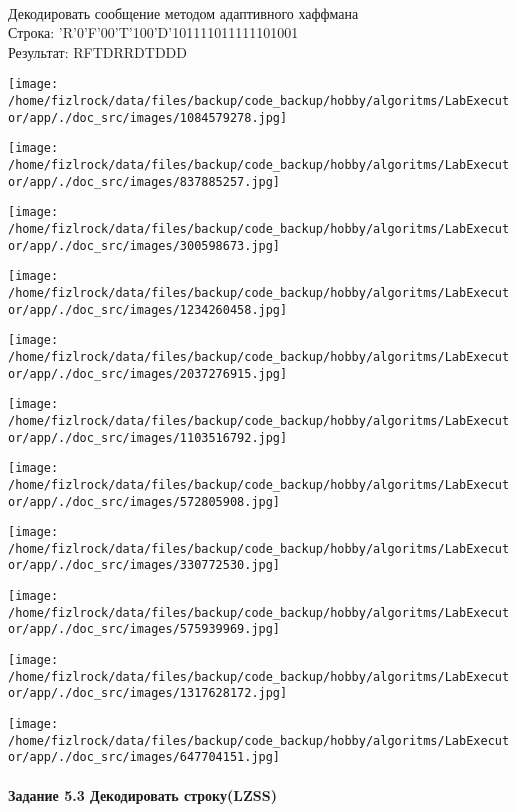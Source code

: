 \documentclass[a4paper, 12pt]{article}
\begin{document}
\\ 

Декодировать сообщение методом адаптивного хаффмана \\
Строка: 
'R'0'F'00'T'100'D'101111011111101001\\
Результат: RFTDRRDTDDD

\texttt{[image: /home/fizlrock/data/files/backup/code\_backup/hobby/algoritms/LabExecutor/app/./doc\_src/images/1084579278.jpg]}

\texttt{[image: /home/fizlrock/data/files/backup/code\_backup/hobby/algoritms/LabExecutor/app/./doc\_src/images/837885257.jpg]}

\texttt{[image: /home/fizlrock/data/files/backup/code\_backup/hobby/algoritms/LabExecutor/app/./doc\_src/images/300598673.jpg]}

\texttt{[image: /home/fizlrock/data/files/backup/code\_backup/hobby/algoritms/LabExecutor/app/./doc\_src/images/1234260458.jpg]}

\texttt{[image: /home/fizlrock/data/files/backup/code\_backup/hobby/algoritms/LabExecutor/app/./doc\_src/images/2037276915.jpg]}

\texttt{[image: /home/fizlrock/data/files/backup/code\_backup/hobby/algoritms/LabExecutor/app/./doc\_src/images/1103516792.jpg]}

\texttt{[image: /home/fizlrock/data/files/backup/code\_backup/hobby/algoritms/LabExecutor/app/./doc\_src/images/572805908.jpg]}

\texttt{[image: /home/fizlrock/data/files/backup/code\_backup/hobby/algoritms/LabExecutor/app/./doc\_src/images/330772530.jpg]}

\texttt{[image: /home/fizlrock/data/files/backup/code\_backup/hobby/algoritms/LabExecutor/app/./doc\_src/images/575939969.jpg]}

\texttt{[image: /home/fizlrock/data/files/backup/code\_backup/hobby/algoritms/LabExecutor/app/./doc\_src/images/1317628172.jpg]}

\texttt{[image: /home/fizlrock/data/files/backup/code\_backup/hobby/algoritms/LabExecutor/app/./doc\_src/images/647704151.jpg]}
\pagebreak
\paragraph{Задание 5.3 Декодировать строку(LZSS)\\}
\end{document}
